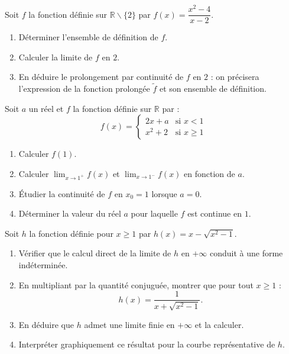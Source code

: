 \documentclass[11pt]{article}
\def\setminus{\mathbin{\backslash}}\let\smallsetminus\setminus
\begin{document}
\begin{exercice}
Soit $f$ la fonction définie sur $\mathbb{R}\setminus\{2\}$ par $f(x)=\dfrac{x^2-4}{x-2}$.
\begin{enumerate}
\item Déterminer l'ensemble de définition de $f$.
\item Calculer la limite de $f$ en $2$.
\item En déduire le prolongement par continuité de $f$ en $2$ : on précisera l'expression de la fonction prolongée $\tilde{f}$ et son ensemble de définition.
\end{enumerate}
\end{exercice}

\begin{exercice}
Soit $a$ un réel et $f$ la fonction définie sur $\mathbb{R}$ par :
\[ f(x)=\begin{cases} 2x+a & \text{si } x<1 \\ x^2+2 & \text{si } x\geq 1 \end{cases} \]
\begin{enumerate}
\item Calculer $f(1)$.
\item Calculer $\displaystyle\lim_{x\to 1^+}f(x)$ et $\displaystyle\lim_{x\to 1^-}f(x)$ en fonction de $a$.
\item Étudier la continuité de $f$ en $x_0=1$ lorsque $a=0$.
\item Déterminer la valeur du réel $a$ pour laquelle $f$ est continue en $1$.
\end{enumerate}
\end{exercice}

\begin{exercice}
Soit $h$ la fonction définie pour $x\geq 1$ par $h(x)=x-\sqrt{x^2-1}$.
\begin{enumerate}
\item Vérifier que le calcul direct de la limite de $h$ en $+\infty$ conduit à une forme indéterminée.
\item En multipliant par la quantité conjuguée, montrer que pour tout $x\geq 1$ :
\[ h(x)=\frac{1}{x+\sqrt{x^2-1}}. \]
\item En déduire que $h$ admet une limite finie en $+\infty$ et la calculer.
\item Interpréter graphiquement ce résultat pour la courbe représentative de $h$.
\end{enumerate}
\end{exercice}
\end{document}
